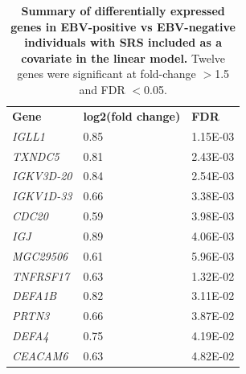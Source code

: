 \begin{table}[]
\begin{center}
\begin{tabular}{lll}
\textbf{Gene}      & \textbf{log2(fold change)} & \textbf{FDR} \\
\textit{IGLL1}     & 0.85                       & 1.15E-03     \\
\textit{TXNDC5}    & 0.81                       & 2.43E-03     \\
\textit{IGKV3D-20} & 0.84                       & 2.54E-03     \\
\textit{IGKV1D-33} & 0.66                       & 3.38E-03     \\
\textit{CDC20}     & 0.59                       & 3.98E-03     \\
\textit{IGJ}       & 0.89                       & 4.06E-03     \\
\textit{MGC29506}  & 0.61                       & 5.96E-03     \\
\textit{TNFRSF17}  & 0.63                       & 1.32E-02     \\
\textit{DEFA1B} & 0.82                       & 3.11E-02     \\
\textit{PRTN3}     & 0.66                       & 3.87E-02     \\
\textit{DEFA4}     & 0.75                       & 4.19E-02     \\
\textit{CEACAM6}   & 0.63                       & 4.82E-02    
\end{tabular}
\end{center}
\caption[Differentially expressed genes in EBV reactivation with SRS as a covariate]{\textbf{Summary of differentially expressed genes in EBV-positive vs EBV-negative individuals with SRS included as a covariate in the linear model.} Twelve genes were significant at fold-change $>$1.5 and FDR $<$0.05.} 
\label{tab:ebv-de-genes-srs}
\end{table}



